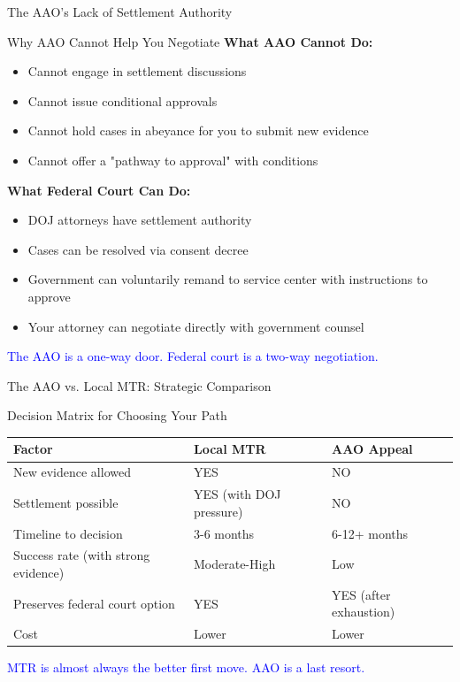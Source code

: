 \documentclass[11pt]{beamer}
\begin{document}
	\begin{frame}{The AAO's Lack of Settlement Authority}
		\scriptsize
		\begin{block}{Why AAO Cannot Help You Negotiate}
			\textbf{What AAO Cannot Do:}
			\begin{itemize}
				\item Cannot engage in settlement discussions
				\item Cannot issue conditional approvals
				\item Cannot hold cases in abeyance for you to submit new evidence
				\item Cannot offer a "pathway to approval" with conditions
			\end{itemize}
			\textbf{What Federal Court Can Do:}
			\begin{itemize}
				\item DOJ attorneys have settlement authority
				\item Cases can be resolved via consent decree
				\item Government can voluntarily remand to service center with instructions to approve
				\item Your attorney can negotiate directly with government counsel
			\end{itemize}
			\textcolor{blue}{The AAO is a one-way door. Federal court is a two-way negotiation.}
		\end{block}
	\end{frame}
	
	\begin{frame}{The AAO vs. Local MTR: Strategic Comparison}
		\scriptsize
		\begin{block}{Decision Matrix for Choosing Your Path}
			\centering
			\begin{tabular}{|p{4cm}|p{3cm}|p{3cm}|}
				\hline
				\textbf{Factor} & \textbf{Local MTR} & \textbf{AAO Appeal} \\
				\hline
				New evidence allowed & YES & NO \\
				\hline
				Settlement possible & YES (with DOJ pressure) & NO \\
				\hline
				Timeline to decision & 3-6 months & 6-12+ months \\
				\hline
				Success rate (with strong evidence) & Moderate-High & Low \\
				\hline
				Preserves federal court option & YES & YES (after exhaustion) \\
				\hline
				Cost & Lower & Lower \\
				\hline
			\end{tabular}
			\vspace{0.2cm}
			\textcolor{blue}{MTR is almost always the better first move. AAO is a last resort.}
		\end{block}
	\end{frame}
	
\end{document}
